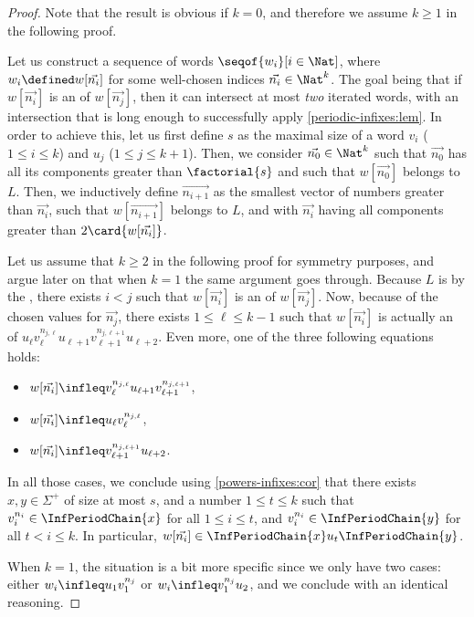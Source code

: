 \begin{proof}
    Note that the result is obvious if $k = 0$, and therefore
    we assume $k \geq 1$ in the following proof.

    Let us construct a sequence of words $\seqof{w_i}[i \in \Nat]$, where $w_i
    \defined w[\vec{n_i}]$ for some well-chosen indices $\vec{n_i} \in \Nat^k$. The goal
    being that 
    if $w[\vec{n_i}]$ is an  of $w[\vec{n_j}]$,
    then it can intersect at most \emph{two} iterated words,
    with an intersection that is long enough to successfully apply
    \cref{periodic-infixes:lem}.
    In order to achieve this,
    let us first define $s$ as the maximal size of a word $v_i$
    ($1 \leq i \leq k$) and $u_j$ ($1 \leq j \leq k+1$).
    Then,
    we consider $\vec{n_0} \in \Nat^k$ such that $\vec{n_0}$ has all 
    its components greater than $\factorial{s}$ and such that
    $w[\vec{n_0}]$ belongs to $L$. 
    Then, we inductively define 
    $\vec{n_{i+1}}$  as the smallest vector of numbers greater than $\vec{n_i}$,
    such that $w[\vec{n_{i+1}}]$ belongs to $L$, 
    and with $\vec{n_i}$ having all components greater than
    $2\card{w[\vec{n_i}]}$.


    Let us assume that $k \geq 2$ in the following proof for symmetry purposes,
    and argue later on that when $k = 1$ the same argument goes through.
    Because $L$ is  by the , there
    exists $i < j$ such that $w[\vec{n_i}]$ is an  of $w[\vec{n_j}]$.
    Now, because of the chosen values for $\vec{n_j}$, there exists $1 \leq \ell \leq
    k-1$ such that $w[\vec{n_i}]$ is actually an  of $u_{\ell}
    v_{\ell}^{n_{j,\ell}} u_{\ell+1} v_{\ell+1}^{n_{j,\ell+1}} u_{\ell+2}$.
    Even more,
    one of the three following equations holds:
    \begin{itemize}
        \item $w[\vec{n_i}] \infleq v_{\ell}^{n_{j,\ell}} u_{\ell+1} v_{\ell+1}^{n_{j,\ell+1}}$,
        \item $w[\vec{n_i}] \infleq u_{\ell}
            v_{\ell}^{n_{j,\ell}}$,
        \item $w[\vec{n_i}] \infleq
            v_{\ell+1}^{n_{j,\ell+1}} u_{\ell+2}$.
    \end{itemize}
    In all those cases, we conclude using \cref{powers-infixes:cor}
    that there exists $x,y \in \Sigma^+$ of size at most $s$, and 
    a number $1 \leq t \leq k$ such that
    $v_i^{n_i} \in \InfPeriodChain{x}$ for all $1 \leq i \leq t$,
    and
    $v_i^{n_i} \in \InfPeriodChain{y}$ for all $t < i \leq k$.
    In particular,
    $w[\vec{n_i}] \in \InfPeriodChain{x} u_{t} \InfPeriodChain{y}$.

    
    When $k = 1$, the situation is a bit more specific since we only have two
    cases: either $w_i \infleq u_1 v_1^{n_j}$ or $w_i \infleq v_1^{n_j} u_2$,
    and we conclude with an identical reasoning.
\end{proof}

